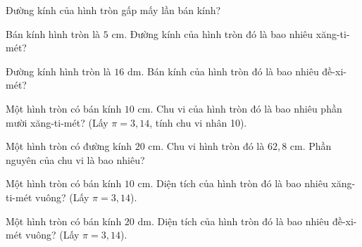 
\begin{ex}
  Đường kính của hình tròn gấp mấy lần bán kính?
\end{ex}

\begin{ex}
  Bán kính hình tròn là $5\text{ cm}$. Đường kính của hình tròn đó là bao nhiêu xăng-ti-mét?
\end{ex}

\begin{ex}
  Đường kính hình tròn là $16\text{ dm}$. Bán kính của hình tròn đó là bao nhiêu đề-xi-mét?
\end{ex}

\begin{ex}
  Một hình tròn có bán kính $10\text{ cm}$. Chu vi của hình tròn đó là bao nhiêu phần mười xăng-ti-mét? (Lấy $\pi = 3{,}14$, tính chu vi nhân 10).
\end{ex}

\begin{ex}
  Một hình tròn có đường kính $20\text{ cm}$. Chu vi hình tròn đó là $62{,}8\text{ cm}$. Phần nguyên của chu vi là bao nhiêu?
\end{ex}

\begin{ex}
  Một hình tròn có bán kính $10\text{ cm}$. Diện tích của hình tròn đó là bao nhiêu xăng-ti-mét vuông? (Lấy $\pi = 3{,}14$).
\end{ex}

\begin{ex}
  Một hình tròn có bán kính $20\text{ dm}$. Diện tích của hình tròn đó là bao nhiêu đề-xi-mét vuông? (Lấy $\pi = 3{,}14$).
\end{ex}

